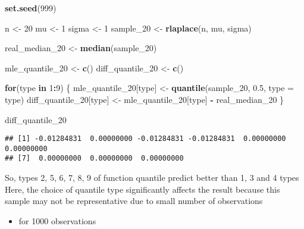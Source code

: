 \documentclass[
]{article}
\newenvironment{Shaded}{\begin{snugshade}}{\end{snugshade}}
\newcommand{\AttributeTok}[1]{\textcolor[rgb]{0.13,0.29,0.53}{#1}}
\newcommand{\ControlFlowTok}[1]{\textcolor[rgb]{0.13,0.29,0.53}{\textbf{#1}}}
\newcommand{\DecValTok}[1]{\textcolor[rgb]{0.00,0.00,0.81}{#1}}
\newcommand{\FloatTok}[1]{\textcolor[rgb]{0.00,0.00,0.81}{#1}}
\newcommand{\FunctionTok}[1]{\textcolor[rgb]{0.13,0.29,0.53}{\textbf{#1}}}
\newcommand{\NormalTok}[1]{#1}
\newcommand{\OtherTok}[1]{\textcolor[rgb]{0.56,0.35,0.01}{#1}}
\newcommand{\SpecialCharTok}[1]{\textcolor[rgb]{0.81,0.36,0.00}{\textbf{#1}}}
\providecommand{\tightlist}{%
  \setlength{\itemsep}{0pt}\setlength{\parskip}{0pt}}
\begin{document}
\begin{Shaded}
\begin{Highlighting}[]
\FunctionTok{set.seed}\NormalTok{(}\DecValTok{999}\NormalTok{)}

\NormalTok{n }\OtherTok{\textless{}{-}} \DecValTok{20}
\NormalTok{mu }\OtherTok{\textless{}{-}} \DecValTok{1}
\NormalTok{sigma }\OtherTok{\textless{}{-}} \DecValTok{1}
\NormalTok{sample\_20 }\OtherTok{\textless{}{-}} \FunctionTok{rlaplace}\NormalTok{(n, mu, sigma)}

\NormalTok{real\_median\_20 }\OtherTok{\textless{}{-}} \FunctionTok{median}\NormalTok{(sample\_20)}

\NormalTok{mle\_quantile\_20 }\OtherTok{\textless{}{-}} \FunctionTok{c}\NormalTok{()}
\NormalTok{diff\_quantile\_20 }\OtherTok{\textless{}{-}} \FunctionTok{c}\NormalTok{()}

\ControlFlowTok{for}\NormalTok{(type }\ControlFlowTok{in} \DecValTok{1}\SpecialCharTok{:}\DecValTok{9}\NormalTok{) \{}
\NormalTok{  mle\_quantile\_20[type] }\OtherTok{\textless{}{-}} \FunctionTok{quantile}\NormalTok{(sample\_20, }\FloatTok{0.5}\NormalTok{, }\AttributeTok{type =}\NormalTok{ type)}
\NormalTok{  diff\_quantile\_20[type] }\OtherTok{\textless{}{-}}\NormalTok{ mle\_quantile\_20[type] }\SpecialCharTok{{-}}\NormalTok{ real\_median\_20}
\NormalTok{\}}

\NormalTok{diff\_quantile\_20}
\end{Highlighting}
\end{Shaded}

\begin{verbatim}
## [1] -0.01284831  0.00000000 -0.01284831 -0.01284831  0.00000000  0.00000000
## [7]  0.00000000  0.00000000  0.00000000
\end{verbatim}

So, types 2, 5, 6, 7, 8, 9 of function quantile predict better than 1, 3
and 4 types Here, the choice of quantile type significantly affects the
result because this sample may not be representative due to small number
of observations

\begin{itemize}
\tightlist
\item
  for 1000 observations
\end{itemize}
\end{document}
